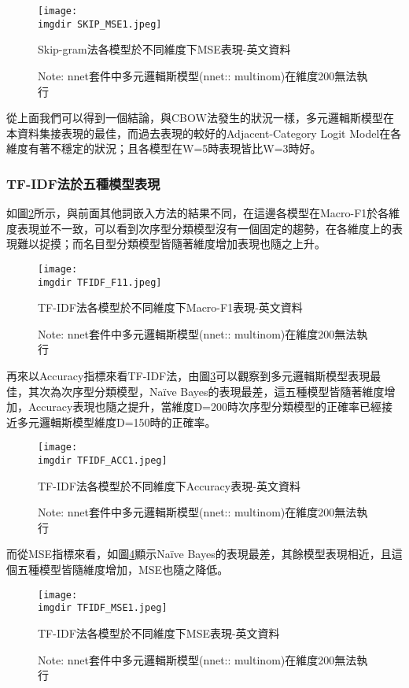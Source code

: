 \begin{figure}[H]
    \centering
        \texttt{[image: \\imgdir SKIP\_MSE1.jpeg]}
    \caption{Skip-gram法各模型於不同維度下MSE表現-英文資料}
    \label{pic.5.3.7-3}
    \caption*{\footnotesize{Note: nnet套件中多元邏輯斯模型(nnet:: multinom)在維度200無法執行}}
\end{figure}	
	
	從上面我們可以得到一個結論，與CBOW法發生的狀況一樣，多元邏輯斯模型在本資料集接表現的最佳，而過去表現的較好的Adjacent-Category Logit Model在各維度有著不穩定的狀況；且各模型在W=5時表現皆比W=3時好。




\subsubsection{TF-IDF法於五種模型表現}

	如圖\ref{pic.5.3.8-1}所示，與前面其他詞嵌入方法的結果不同，在這邊各模型在Macro-F1於各維度表現並不一致，可以看到次序型分類模型沒有一個固定的趨勢，在各維度上的表現難以捉摸；而名目型分類模型皆隨著維度增加表現也隨之上升。
	
\begin{figure}[H]
    \centering
        \texttt{[image: \\imgdir TFIDF\_F11.jpeg]}
    \caption{TF-IDF法各模型於不同維度下Macro-F1表現-英文資料}
    \label{pic.5.3.8-1}
    \caption*{\footnotesize{Note: nnet套件中多元邏輯斯模型(nnet:: multinom)在維度200無法執行}}
\end{figure}
	
	再來以Accuracy指標來看TF-IDF法，由圖\ref{pic.5.3.8-2}可以觀察到多元邏輯斯模型表現最佳，其次為次序型分類模型，Naïve Bayes的表現最差，這五種模型皆隨著維度增加，Accuracy表現也隨之提升，當維度D=200時次序型分類模型的正確率已經接近多元邏輯斯模型維度D=150時的正確率。
	
\begin{figure}[H]
    \centering
        \texttt{[image: \\imgdir TFIDF\_ACC1.jpeg]}
    \caption{TF-IDF法各模型於不同維度下Accuracy表現-英文資料}
    \label{pic.5.3.8-2}
    \caption*{\footnotesize{Note: nnet套件中多元邏輯斯模型(nnet:: multinom)在維度200無法執行}}
\end{figure}	
	
	而從MSE指標來看，如圖\ref{pic.5.3.8-3}顯示Naïve Bayes的表現最差，其餘模型表現相近，且這個五種模型皆隨維度增加，MSE也隨之降低。
	
\begin{figure}[H]
    \centering
        \texttt{[image: \\imgdir TFIDF\_MSE1.jpeg]}
    \caption{TF-IDF法各模型於不同維度下MSE表現-英文資料}
    \label{pic.5.3.8-3}
    \caption*{\footnotesize{Note: nnet套件中多元邏輯斯模型(nnet:: multinom)在維度200無法執行}}
\end{figure}	
	
